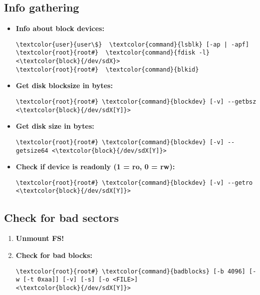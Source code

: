 \documentclass[10pt, a4paper, onecolumn, openany]{book} %
\begin{document}
\subsection{Info gathering}
\begin{itemize}
    \item \textbf{Info about block devices:}
\begin{Verbatim}[commandchars=\\\{\}]
\textcolor{user}{user\$}  \textcolor{command}{lsblk} [-ap | -apf]
\textcolor{root}{root#}  \textcolor{command}{fdisk -l} <\textcolor{block}{/dev/sdX}>
\textcolor{root}{root#}  \textcolor{command}{blkid}
\end{Verbatim}
    \item \textbf{Get disk blocksize in bytes:}
\begin{Verbatim}[commandchars=\\\{\}]
\textcolor{root}{root#} \textcolor{command}{blockdev} [-v] --getbsz <\textcolor{block}{/dev/sdX[Y]}>
\end{Verbatim}
    \item \textbf{Get disk size in bytes:}
\begin{Verbatim}[commandchars=\\\{\}]
\textcolor{root}{root#} \textcolor{command}{blockdev} [-v] --getsize64 <\textcolor{block}{/dev/sdX[Y]}>
\end{Verbatim}
    \item \textbf{Check if device is readonly (1 = ro, 0 = rw):}
\begin{Verbatim}[commandchars=\\\{\}]
\textcolor{root}{root#} \textcolor{command}{blockdev} [-v] --getro <\textcolor{block}{/dev/sdX[Y]}>
\end{Verbatim}
\end{itemize}
\subsection{Check for bad sectors}
\begin{enumerate}
    \item \textbf{Unmount FS!}
    \item \textbf{Check for bad blocks:}
\begin{Verbatim}[commandchars=\\\{\}]
\textcolor{root}{root#} \textcolor{command}{badblocks} [-b 4096] [-w [-t 0xaa]] [-v] [-s] [-o <FILE>] 
<\textcolor{block}{/dev/sdX[Y]}>
\end{Verbatim}
\end{enumerate}
\end{document}
